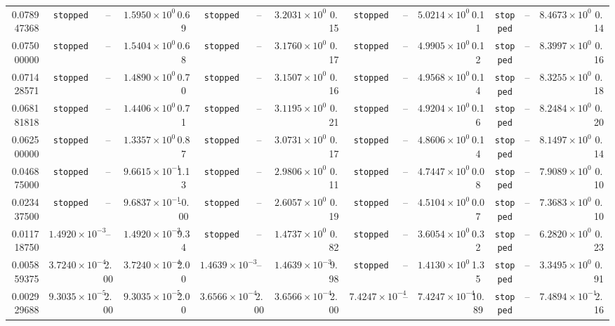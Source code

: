 \begin{table}
{\begin{tabular}{r cc cc cc cc cc cc cc cc }
0.078947368 & \texttt{stopped} & -- & $1.5950\times10^{0}$ & 0.69 & \texttt{stopped} & -- & $3.2031\times10^{0}$ & 0.15 & \texttt{stopped} & -- & $5.0214\times10^{0}$ & 0.11 & \texttt{stopped} & -- & $8.4673\times10^{0}$ & 0.14 \\
0.075000000 & \texttt{stopped} & -- & $1.5404\times10^{0}$ & 0.68 & \texttt{stopped} & -- & $3.1760\times10^{0}$ & 0.17 & \texttt{stopped} & -- & $4.9905\times10^{0}$ & 0.12 & \texttt{stopped} & -- & $8.3997\times10^{0}$ & 0.16 \\
0.071428571 & \texttt{stopped} & -- & $1.4890\times10^{0}$ & 0.70 & \texttt{stopped} & -- & $3.1507\times10^{0}$ & 0.16 & \texttt{stopped} & -- & $4.9568\times10^{0}$ & 0.14 & \texttt{stopped} & -- & $8.3255\times10^{0}$ & 0.18 \\
0.068181818 & \texttt{stopped} & -- & $1.4406\times10^{0}$ & 0.71 & \texttt{stopped} & -- & $3.1195\times10^{0}$ & 0.21 & \texttt{stopped} & -- & $4.9204\times10^{0}$ & 0.16 & \texttt{stopped} & -- & $8.2484\times10^{0}$ & 0.20 \\
0.062500000 & \texttt{stopped} & -- & $1.3357\times10^{0}$ & 0.87 & \texttt{stopped} & -- & $3.0731\times10^{0}$ & 0.17 & \texttt{stopped} & -- & $4.8606\times10^{0}$ & 0.14 & \texttt{stopped} & -- & $8.1497\times10^{0}$ & 0.14 \\
0.046875000 & \texttt{stopped} & -- & $9.6615\times10^{-1}$ & 1.13 & \texttt{stopped} & -- & $2.9806\times10^{0}$ & 0.11 & \texttt{stopped} & -- & $4.7447\times10^{0}$ & 0.08 & \texttt{stopped} & -- & $7.9089\times10^{0}$ & 0.10 \\
0.023437500 & \texttt{stopped} & -- & $9.6837\times10^{-1}$ & -0.00 & \texttt{stopped} & -- & $2.6057\times10^{0}$ & 0.19 & \texttt{stopped} & -- & $4.5104\times10^{0}$ & 0.07 & \texttt{stopped} & -- & $7.3683\times10^{0}$ & 0.10 \\
0.011718750 & $1.4920\times10^{-3}$ & -- & $1.4920\times10^{-3}$ & 9.34 & \texttt{stopped} & -- & $1.4737\times10^{0}$ & 0.82 & \texttt{stopped} & -- & $3.6054\times10^{0}$ & 0.32 & \texttt{stopped} & -- & $6.2820\times10^{0}$ & 0.23 \\
0.005859375 & $3.7240\times10^{-4}$ & 2.00 & $3.7240\times10^{-4}$ & 2.00 & $1.4639\times10^{-3}$ & -- & $1.4639\times10^{-3}$ & 9.98 & \texttt{stopped} & -- & $1.4130\times10^{0}$ & 1.35 & \texttt{stopped} & -- & $3.3495\times10^{0}$ & 0.91 \\
0.002929688 & $9.3035\times10^{-5}$ & 2.00 & $9.3035\times10^{-5}$ & 2.00 & $3.6566\times10^{-4}$ & 2.00 & $3.6566\times10^{-4}$ & 2.00 & $7.4247\times10^{-4}$ & -- & $7.4247\times10^{-4}$ & 10.89 & \texttt{stopped} & -- & $7.4894\times10^{-1}$ & 2.16 \\
\bottomrule
\end{tabular}}
\end{table}
